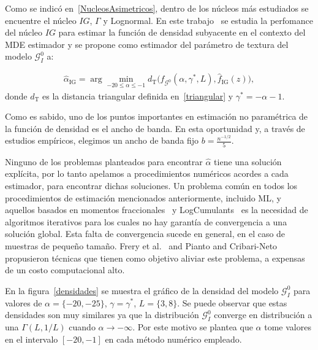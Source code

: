 Como se indicó en~\ref{NucleosAsimetricos}, dentro de los núcleos más estudiados se encuentre el núcleo $IG$, $\Gamma$ y Lognormal. En este trabajo~\cite{gambini2015} se estudia la perfomance del núcleo $IG$ para estimar la función de densidad subyacente en el contexto del MDE estimador y se propone como estimador del parámetro de textura del modelo $\mathcal{G}_I^0$ a:

\begin{align}
\widehat{\alpha}_{\text{IG}}= \arg\min_{-20\leq \alpha \leq -1} d_{\text{T}}\big(f_{\mathcal{G}^{0}}(\alpha,\gamma^*, L ), \widehat f_\text{IG}(z)\big),
\label{minimization}
\end{align}
donde $d_{\text{T}}$ es la distancia triangular definida en~\ref{triangular} y $\gamma^*=-\alpha-1$.  

Como es sabido, uno de los puntos importantes en estimación no paramétrica de la función de densidad es el ancho de banda. En esta oportunidad y, a través de estudios empíricos, elegimos un ancho de banda fijo $b=\frac{n^{-1/2}}{5}$.

Ninguno de los problemas planteados para encontrar $\widehat{\alpha}$ tiene una solución explícita, por lo tanto apelamos a procedimientos numéricos acordes a cada estimador, para encontrar dichas soluciones. Un problema común en todos los procedimientos de estimación mencionados anteriormente, incluido ML, y aquellos basados en momentos fraccionales~\cite{Frery97} y LogCumulants~\cite{MellinAnalysisPolSAR,BujorTrouveValetNicolas2004,khan2014} es la necesidad de algoritmos iterativos para los cuales no hay garantía de convergencia a una solución global. Esta falta de convergencia sucede en general, en el caso de muestras de pequeño tamaño. Frery et al.~\cite{FreryCribariSouza:JASP:04} and Pianto and Cribari-Neto~\cite{DealingMonotoneLikelihood} propusieron técnicas que tienen como objetivo aliviar este problema, a expensas de un costo computacional alto.


En la figura~\ref{densidades} se muestra el gráfico de la densidad del modelo $\mathcal{G}_I^0$ para valores de $\alpha=\{-20,-25\}$, $\gamma=\gamma^*$, $L=\{3,8\}$. Se puede observar que estas densidades son muy similares ya que la distribución $\mathcal{G}_I^0$ converge en distribución a una $\Gamma(L,1/L)$ cuando $\alpha \longrightarrow -\infty$. Por este motivo se plantea que $\alpha$ tome valores en el intervalo $[-20,-1]$ en cada método numérico empleado. 

